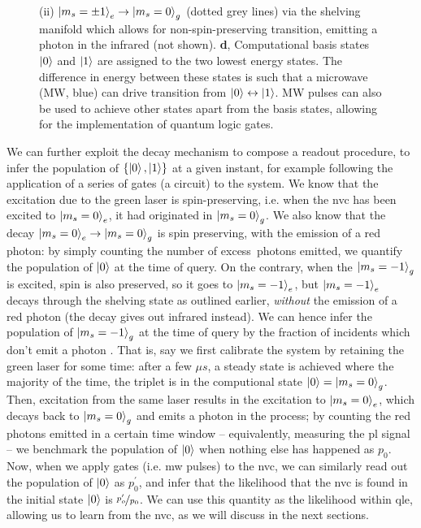 \begin{figure}[t]
{            (ii) $\ket{m_s=\pm 1}_e \rightarrow \ket{m_s=0}_g$ (dotted grey lines) via the shelving manifold which allows for non-spin-preserving transition, 
            emitting a photon in the infrared (not shown).
        \textbf{d}, Computational basis states $\ket{0}$ and $\ket{1}$ are assigned to the two lowest energy states.
            The difference in energy between these states is such that a microwave (MW, blue) 
                can drive transition from $\ket{0} \leftrightarrow \ket{1}$.
            MW pulses can also be used to achieve other states apart from the basis states,
                allowing for the implementation of quantum logic gates. 
    }
    \label{fig:nv_centre_energy_levels}
\end{figure}


We can further exploit the decay mechanism to compose a readout procedure, 
    to infer the population of $\{\ket{0}, \ket{1}\}$ at a given instant, 
    for example following the application of a series of gates (a circuit) to the system. 
We know that the excitation due to the green laser is spin-preserving, 
    i.e. when the \gls{nvc} has been excited to $\ket{m_s=0}_e$, 
    it had originated in $\ket{m_s=0}_g$.
We also know that the decay $\ket{m_s=0}_e \rightarrow \ket{m_s=0}_g$ is spin preserving, with the emission of 
    a red photon: by simply counting the number of excess\footnotemark \ photons emitted, 
    we quantify the population of $\ket{0}$ at the time of query. 
On the contrary, when the $\ket{m_s=-1}_g$ is excited, 
    spin is also preserved, so it goes to $\ket{m_s=-1}_e$, 
    but $\ket{m_s=-1}_e$ decays through the shelving state as outlined earlier, 
    \emph{without} the emission of a red photon (the decay gives out infrared instead). 
We can hence infer the population of $\ket{m_s=-1}_g$ at the time of query by the fraction of incidents which don't 
    emit a photon \cite{knauer2016photonic}.
That is, say we first calibrate the system by retaining the green laser for some time: 
    after a few $\mu s$, a steady state is achieved where the majority of the time, the triplet is in the computional state $\ket{0} = \ket{m_s=0}_g$. 
Then, excitation from the same laser results in the excitation to $\ket{m_s=0}_e$, 
    which decays back to $\ket{m_s=0}_g$ and emits a photon in the process; 
    by counting the red photons emitted in a certain time window -- equivalently, measuring the \gls{pl} signal -- 
    we benchmark the population of $\ket{0}$ when nothing else has happened as $p_0$. 
Now, when we apply gates (i.e. \gls{mw} pulses) to the \gls{nvc}, 
    we can similarly read out the population of $\ket{0}$ as $p_0^{\prime}$,
    and infer that the \gls{likelihood} that the \gls{nvc} is found in the initial state $\ket{0}$ is $\nicefrac{p_o^{\prime}}{p_0}$. 
We can use this quantity as the  \gls{likelihood} within \gls{qle}, allowing us to learn from the \gls{nvc},
    as we will discuss in the next sections. 

